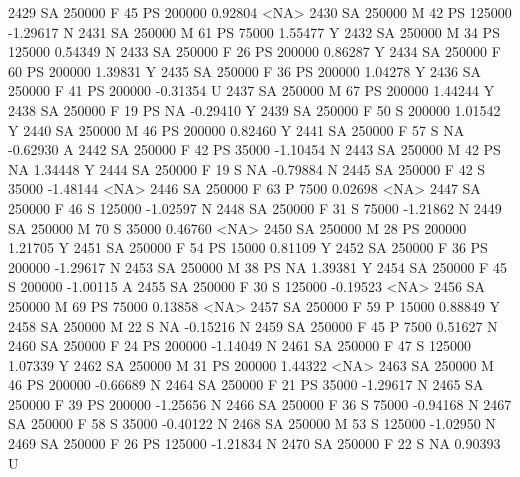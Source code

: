 \documentclass{article}
\begin{document}
\begin{Schunk}
\begin{Soutput}
2429     SA     250000   F  45        PS 200000   0.92804 <NA>
2430     SA     250000   M  42        PS 125000  -1.29617    N
2431     SA     250000   M  61        PS  75000   1.55477    Y
2432     SA     250000   M  34        PS 125000   0.54349    N
2433     SA     250000   F  26        PS 200000   0.86287    Y
2434     SA     250000   F  60        PS 200000   1.39831    Y
2435     SA     250000   F  36        PS 200000   1.04278    Y
2436     SA     250000   F  41        PS 200000  -0.31354    U
2437     SA     250000   M  67        PS 200000   1.44244    Y
2438     SA     250000   F  19        PS     NA  -0.29410    Y
2439     SA     250000   F  50         S 200000   1.01542    Y
2440     SA     250000   M  46        PS 200000   0.82460    Y
2441     SA     250000   F  57         S     NA  -0.62930    A
2442     SA     250000   F  42        PS  35000  -1.10454    N
2443     SA     250000   M  42        PS     NA   1.34448    Y
2444     SA     250000   F  19         S     NA  -0.79884    N
2445     SA     250000   F  42         S  35000  -1.48144 <NA>
2446     SA     250000   F  63         P   7500   0.02698 <NA>
2447     SA     250000   F  46         S 125000  -1.02597    N
2448     SA     250000   F  31         S  75000  -1.21862    N
2449     SA     250000   M  70         S  35000   0.46760 <NA>
2450     SA     250000   M  28        PS 200000   1.21705    Y
2451     SA     250000   F  54        PS  15000   0.81109    Y
2452     SA     250000   F  36        PS 200000  -1.29617    N
2453     SA     250000   M  38        PS     NA   1.39381    Y
2454     SA     250000   F  45         S 200000  -1.00115    A
2455     SA     250000   F  30         S 125000  -0.19523 <NA>
2456     SA     250000   M  69        PS  75000   0.13858 <NA>
2457     SA     250000   F  59         P  15000   0.88849    Y
2458     SA     250000   M  22         S     NA  -0.15216    N
2459     SA     250000   F  45         P   7500   0.51627    N
2460     SA     250000   F  24        PS 200000  -1.14049    N
2461     SA     250000   F  47         S 125000   1.07339    Y
2462     SA     250000   M  31        PS 200000   1.44322 <NA>
2463     SA     250000   M  46        PS 200000  -0.66689    N
2464     SA     250000   F  21        PS  35000  -1.29617    N
2465     SA     250000   F  39        PS 200000  -1.25656    N
2466     SA     250000   F  36         S  75000  -0.94168    N
2467     SA     250000   F  58         S  35000  -0.40122    N
2468     SA     250000   M  53         S 125000  -1.02950    N
2469     SA     250000   F  26        PS 125000  -1.21834    N
2470     SA     250000   F  22         S     NA   0.90393    U

\end{Soutput}
\end{Schunk}
\end{document}
